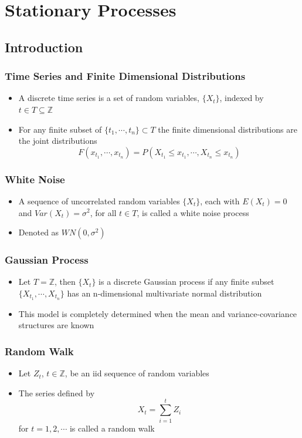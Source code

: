\documentclass[11pt]{article}
\newcommand{\Z}{{\mathbb{Z}}}
\begin{document}
\section{Stationary Processes}
\subsection{Introduction}
\subsubsection{Time Series and Finite Dimensional Distributions}
\begin{itemize}
    \item A discrete time series is a set of random variables, $\{X_t\}$, indexed by $t\in T\subseteq \Z$
    \item For any finite subset of $\{t_1,\cdots,t_n\}\subset T$ the finite dimensional distributions are the joint distributions \[F(x_{t_1},\cdots,x_{t_n})=P(X_{t_1}\leq x_{t_1},\cdots,X_{t_n}\leq x_{t_n})\]
\end{itemize}
\subsubsection{White Noise}
\begin{itemize}
    \item A sequence of uncorrelated random variables $\{X_t\}$, each with $E(X_t)=0$ and $Var(X_t)=\sigma^2$, for all $t\in T$, is called a white noise process 
    \item Denoted as $WN(0,\sigma^2)$
\end{itemize}
\subsubsection{Gaussian Process}
\begin{itemize}
    \item Let $T=\Z$, then $\{X_t\}$ is a discrete Gaussian process if any finite subset $\{X_{t_1},\cdots,X_{t_n}\}$ has an n-dimensional multivariate normal distribution 
    \item This model is completely determined when the mean and variance-covariance structures are known 
\end{itemize}
\subsubsection{Random Walk}
\begin{itemize}
    \item Let $Z_t$, $t\in\Z$, be an iid sequence of random variables 
    \item The series defined by \[X_t=\sum_{i=1}^{t}Z_i\] for $t=1,2,\cdots$ is called a random walk 
\end{itemize}
\end{document}
